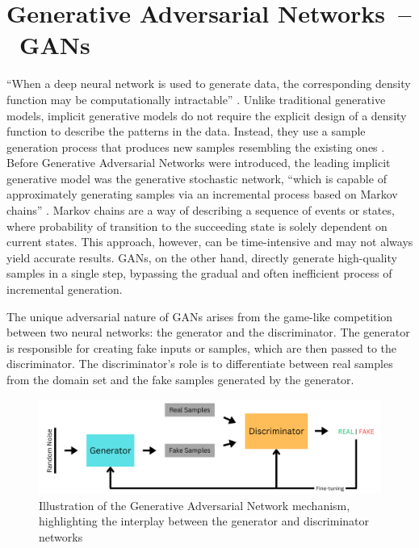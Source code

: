 \section{Generative Adversarial Networks~--~GANs}\label{GAN}

``When a deep neural network is used to generate data, the corresponding density function may be computationally intractable'' \citep{goodfellowGAN}. Unlike traditional generative models, implicit generative models do not require the explicit design of a density function to describe the patterns in the data. Instead, they use a sample generation process that produces new samples resembling the existing ones \citep{goodfellowGAN}. Before Generative Adversarial Networks were introduced, the leading implicit generative model was the generative stochastic network, ``which is capable of approximately generating samples via an incremental process based on Markov chains'' \citep{goodfellowGAN}. Markov chains are a way of describing a sequence of events or states, where probability of transition to the succeeding state is solely dependent on current states. This approach, however, can be time-intensive and may not always yield accurate results. GANs, on the other hand, directly generate high-quality samples in a single step, bypassing the gradual and often inefficient process of incremental generation.

The unique adversarial nature of GANs arises from the game-like competition between two neural networks: the generator and the discriminator. The generator is responsible for creating fake inputs or samples, which are then passed to the discriminator. The discriminator's role is to differentiate between real samples from the domain set and the fake samples generated by the generator.

\begin{figure}[ht]
\centering
  \includegraphics[width=1\columnwidth]{figures/Generator.png}
  \caption{Illustration of the Generative Adversarial Network mechanism, highlighting the interplay between the generator and discriminator networks}\label{fig:figureGAN}
\end{figure}


